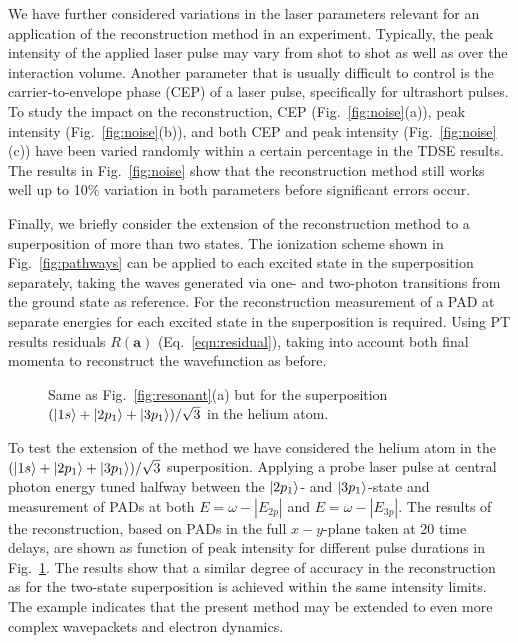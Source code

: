 We have further considered variations in the laser parameters relevant for an application of the reconstruction method in an experiment. Typically, the peak intensity of the applied laser pulse may vary from shot to shot as well as over the interaction volume. Another parameter that is usually difficult to control is the carrier-to-envelope phase (CEP) of a laser pulse, specifically for ultrashort pulses. To study the impact on the reconstruction, CEP (Fig.~\ref{fig:noise}(a)), peak intensity (Fig.~\ref{fig:noise}(b)), and both CEP and peak intensity (Fig.~\ref{fig:noise}(c)) have been varied randomly within a certain percentage in the TDSE results. The results in Fig.~\ref{fig:noise} show that the reconstruction method still works well up to 10\% variation in both parameters before significant errors occur.


Finally, we briefly consider the extension of the reconstruction method to a superposition of more than two states. The ionization scheme shown in Fig.\ \ref{fig:pathways} can be applied to each excited state in the superposition separately, taking the waves generated via one- and two-photon transitions from the ground state as reference. For the reconstruction measurement of a PAD at separate energies for each excited state in the superposition is required. Using PT results residuals $R(\mathbf{a})$ (Eq.\ \ref{eqn:residual}), taking into account both final momenta to reconstruct the wavefunction as before.

\begin{figure}[t]
\centering
\caption{Same as Fig.\ \ref{fig:resonant}(a) but for the superposition $(\ket{1s}+\ket{2p_1}+\ket{3p_1})/\sqrt{3}$ in the helium atom. 
} 
  \label{fig:3-state}
\end{figure}

To test the extension of the method we have considered the helium atom in the $(\ket{1s}+\ket{2p_1}+\ket{3p_1})/\sqrt{3}$ superposition. Applying a probe laser pulse at central photon energy tuned halfway between the $\ket{2p_1}$- and $\ket{3p_1}$-state and measurement of PADs at both $E=\omega-|E_{2p}|$ and $E=\omega-|E_{3p}|$. The results of the reconstruction, based on PADs in the full $x-y$-plane taken at 20 time delays, are shown as function of peak intensity for different pulse durations in Fig.~\ref{fig:3-state}. The results show that a similar degree of accuracy in the reconstruction as for the two-state superposition is achieved within the same intensity limits. The example indicates that the present method may be extended to even more complex wavepackets and electron dynamics. 

